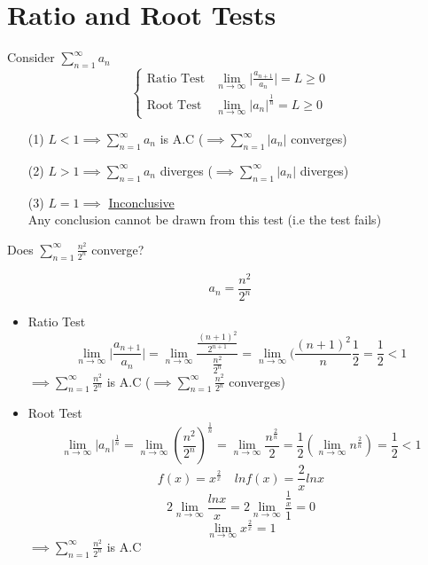 \section{Ratio and Root Tests}
\begin{defn}
Consider \(\displaystyle \sum^{\infty}_{n = 1} a_n\)
\[\left\{\begin{array}{cr}
\text{Ratio Test} & \displaystyle \lim_{n \to \infty} \Big| \frac{a_{n + 1}}{a_n} \Big| = L \geq 0\\
\text{Root Test} & \displaystyle \lim_{n \to \infty} \Big| a_n\Big| ^{\frac{1}{n}} = L \geq 0
\end{array}\right.\]
\begin{itemize}
\item[(1)] \(\displaystyle L < 1 \implies \sum^{\infty}_{n = 1} a_n\) is A.C (\(\displaystyle \implies\sum^{\infty}_{n = 1} \Big| a_n \Big|\) converges)
\item[(2)] \(\displaystyle L > 1 \implies \sum^{\infty}_{n = 1} a_n\) diverges (\(\displaystyle \implies \sum^{\infty}_{n = 1} \Big| a_n \Big|\) diverges)
\item[(3)] \(\displaystyle L = 1 \implies\) \underline{Inconclusive}\\
Any conclusion cannot be drawn from this test (i.e the test fails)
\end{itemize}
\end{defn}
\begin{eg}
Does \(\displaystyle \sum^{\infty}_{n = 1} \frac{n^2}{2^n}\) converge?

\soln
\[\displaystyle a_n = \frac{n^2}{2^n}\]
\begin{itemize}
\item Ratio Test\\
\[\displaystyle \lim_{n \to \infty} \Big| \frac{a_{n +1}}{a_n} \Big| = \lim_{n \to \infty} \frac{\frac{(n+1)^2}{2^{n +1}}}{\frac{n^2}{2^n}} = \lim_{n \to \infty} (\frac{(n + 1)^2}{n} \frac{1}{2} = \frac{1}{2} < 1\]
\(\implies \displaystyle \sum^{\infty}_{n = 1} \frac{n^2}{2^n}\) is A.C (\(\displaystyle \implies \sum^{\infty}_{n = 1} \frac{n^2}{2^n}\) converges)
\item Root Test\\
\[\displaystyle \lim_{n \to \infty} \Big| a_n \Big|^{\frac{1}{n}} = \lim_{n \to \infty} (\frac{n^2}{2^n})^{\frac{1}{n}} = \lim_{n \to \infty} \frac{n^{\frac{2}{n}}}{2} = \frac{1}{2} (\lim_{n \to \infty} n^{\frac{2}{n}}) = \frac{1}{2} < 1\]
\[\displaystyle f(x) = x^{\frac{2}{x}} \quad ln f(x) = \frac{2}{x} ln x\]
\[\displaystyle 2 \lim_{n \to \infty} \frac{ln x}{x} = 2 \lim_{n \to \infty} \frac{\frac{1}{x}}{1} = 0\]
\[\displaystyle \lim_{n \to \infty} x^{\frac{2}{x}}= 1\]
\(\displaystyle \implies \sum^{\infty}_{n = 1} \frac{n^2}{2^n}\) is A.C
\end{itemize}
\end{eg}
